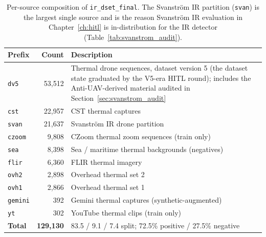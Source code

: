 \begin{table}[htbp]
    \centering
    \caption{Per-source composition of \texttt{ir\_dset\_final}. The Svanstr\"om IR partition (\texttt{svan}) is the largest single source and is the reason Svanstr\"om IR evaluation in Chapter~\ref{ch:hitl} is in-distribution for the IR detector (Table~\ref{tab:svanstrom_audit}).}
    \label{tab:ds_ir_components}
    \begin{tabular}{lrp{7.2cm}}
        \toprule
        Prefix & Count & Description \\
        \midrule
        \texttt{dv5}    & 53{,}512 & Thermal drone sequences, dataset version 5 (the dataset state graduated by the V5-era HITL round); includes the Anti-UAV-derived material audited in Section~\ref{sec:svanstrom_audit} \\
        \texttt{cst}    & 22{,}957 & CST thermal captures \\
        \texttt{svan}   & 21{,}637 & Svanstr\"om IR drone partition \\
        \texttt{czoom}  &  9{,}808 & CZoom thermal zoom sequences (train only) \\
        \texttt{sea}    &  8{,}398 & Sea / maritime thermal backgrounds (negatives) \\
        \texttt{flir}   &  6{,}360 & FLIR thermal imagery \\
        \texttt{ovh2}   &  2{,}898 & Overhead thermal set 2 \\
        \texttt{ovh1}   &  2{,}866 & Overhead thermal set 1 \\
        \texttt{gemini} &     392 & Gemini thermal captures (synthetic-augmented) \\
        \texttt{yt}     &     302 & YouTube thermal clips (train only) \\
        \midrule
        \textbf{Total}  & \textbf{129{,}130} & 83.5 / 9.1 / 7.4 split; 72.5\% positive / 27.5\% negative \\
        \bottomrule
    \end{tabular}
\end{table}

